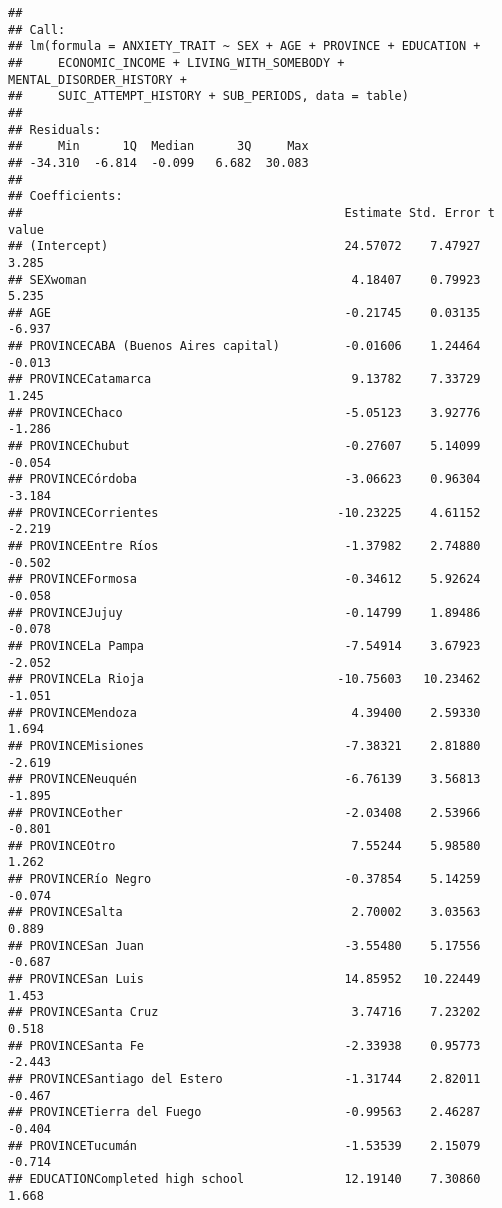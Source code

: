 \documentclass[
]{book}
\begin{document}
\begin{verbatim}
## 
## Call:
## lm(formula = ANXIETY_TRAIT ~ SEX + AGE + PROVINCE + EDUCATION + 
##     ECONOMIC_INCOME + LIVING_WITH_SOMEBODY + MENTAL_DISORDER_HISTORY + 
##     SUIC_ATTEMPT_HISTORY + SUB_PERIODS, data = table)
## 
## Residuals:
##     Min      1Q  Median      3Q     Max 
## -34.310  -6.814  -0.099   6.682  30.083 
## 
## Coefficients:
##                                             Estimate Std. Error t value
## (Intercept)                                 24.57072    7.47927   3.285
## SEXwoman                                     4.18407    0.79923   5.235
## AGE                                         -0.21745    0.03135  -6.937
## PROVINCECABA (Buenos Aires capital)         -0.01606    1.24464  -0.013
## PROVINCECatamarca                            9.13782    7.33729   1.245
## PROVINCEChaco                               -5.05123    3.92776  -1.286
## PROVINCEChubut                              -0.27607    5.14099  -0.054
## PROVINCECórdoba                             -3.06623    0.96304  -3.184
## PROVINCECorrientes                         -10.23225    4.61152  -2.219
## PROVINCEEntre Ríos                          -1.37982    2.74880  -0.502
## PROVINCEFormosa                             -0.34612    5.92624  -0.058
## PROVINCEJujuy                               -0.14799    1.89486  -0.078
## PROVINCELa Pampa                            -7.54914    3.67923  -2.052
## PROVINCELa Rioja                           -10.75603   10.23462  -1.051
## PROVINCEMendoza                              4.39400    2.59330   1.694
## PROVINCEMisiones                            -7.38321    2.81880  -2.619
## PROVINCENeuquén                             -6.76139    3.56813  -1.895
## PROVINCEother                               -2.03408    2.53966  -0.801
## PROVINCEOtro                                 7.55244    5.98580   1.262
## PROVINCERío Negro                           -0.37854    5.14259  -0.074
## PROVINCESalta                                2.70002    3.03563   0.889
## PROVINCESan Juan                            -3.55480    5.17556  -0.687
## PROVINCESan Luis                            14.85952   10.22449   1.453
## PROVINCESanta Cruz                           3.74716    7.23202   0.518
## PROVINCESanta Fe                            -2.33938    0.95773  -2.443
## PROVINCESantiago del Estero                 -1.31744    2.82011  -0.467
## PROVINCETierra del Fuego                    -0.99563    2.46287  -0.404
## PROVINCETucumán                             -1.53539    2.15079  -0.714
## EDUCATIONCompleted high school              12.19140    7.30860   1.668

\end{verbatim}
\end{document}
